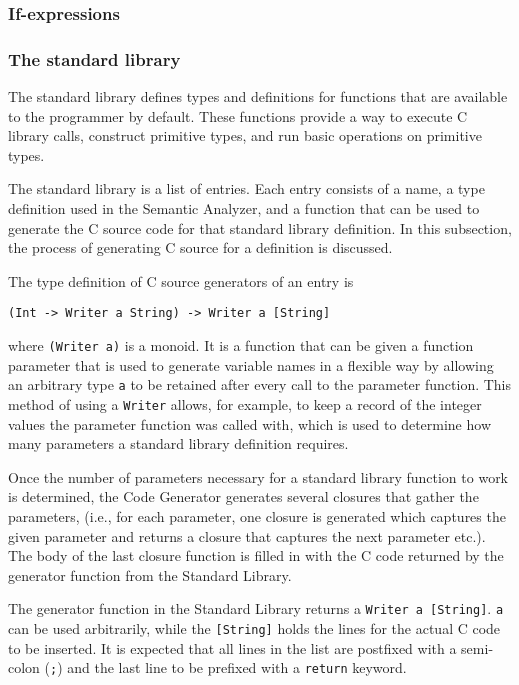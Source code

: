 \documentclass[12pt]{article}
\begin{document}
\subsubsection{If-expressions} %

\subsubsection{The standard library}

The standard library defines types and definitions for functions that are
available to the programmer by default. These functions provide a way to execute
C library calls, construct primitive types, and run basic operations on
primitive types.

The standard library is a list of entries. Each entry consists of a name, a type
definition used in the Semantic Analyzer, and a function that can be used to
generate the C source code for that standard library definition. In this
subsection, the process of generating C source for a definition is discussed.

The type definition of C source generators of an entry is
\begin{lstlisting}
(Int -> Writer a String) -> Writer a [String]
\end{lstlisting}
where \verb$(Writer a)$ is a monoid. It is a function that can be given a
function parameter that is used to generate variable names in a flexible way by
allowing an arbitrary type \verb$a$ to be retained after every call to the
parameter function. This method of using a \verb$Writer$ allows, for example, to
keep a record of the integer values the parameter function was called with,
which is used to determine how many parameters a standard library definition
requires.

Once the number of parameters necessary for a standard library function to work
is determined, the Code Generator generates several closures that gather the
parameters, (i.e., for each parameter, one closure is generated which captures
the given parameter and returns a closure that captures the next parameter
etc.). The body of the last closure function is filled in with the C code
returned by the generator function from the Standard Library.

The generator function in the Standard Library returns a 
\verb$Writer a [String]$. \verb$a$ can be used arbitrarily, while the
\verb$[String]$ holds the lines for the actual C code to be inserted. It is
expected that all lines in the list are postfixed with a semi-colon (\verb$;$)
and the last line to be prefixed with a \verb$return$ keyword.
\end{document}
